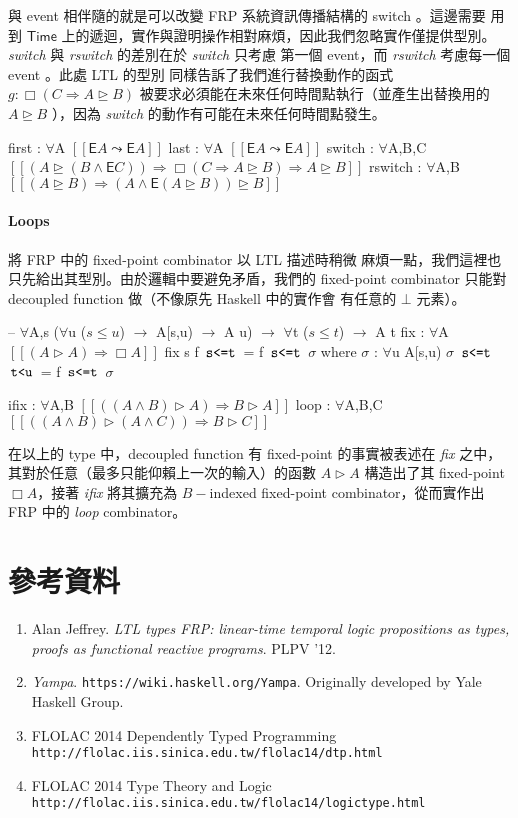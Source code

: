 \documentclass{article}
\newcommand{\llens}{[\![}
\newcommand{\rlens}{]\!]}
\newcommand{\Time}{\mathsf{Time}}
\newcommand{\TE}{\mathsf{E}}
\newcommand{\Wit}[1]{\,\text{\texttt{#1}}\,}
\newcommand{\Gs}{\sigma}
\begin{document}
  與 event 相伴隨的就是可以改變 FRP 系統資訊傳播結構的 switch 。這邊需要
  用到 $\Time$ 上的遞迴，實作與證明操作相對麻煩，因此我們忽略實作僅提供型別。
  \textit{switch} 與 \textit{rswitch} 的差別在於 \textit{switch} 只考慮
  第一個 event，而 \textit{rswitch} 考慮每一個 event 。此處 LTL 的型別
  同樣告訴了我們進行替換動作的函式 $g : \Box (C \Rightarrow A \unrhd B)$
  被要求必須能在未來任何時間點執行（並產生出替換用的 $A\unrhd B$ ），因為
  \textit{switch} 的動作有可能在未來任何時間點發生。

  \begin{code}
  first : $\forall${A} $\llens \TE A\leadsto \TE A\rlens$
  last : $\forall${A} $\llens \TE A\leadsto \TE A\rlens$
  switch : $\forall${A,B,C} $\llens (A\unrhd (B\land \TE C))\Rightarrow \Box(C\Rightarrow A\unrhd B) \Rightarrow A\unrhd B\rlens$
  rswitch : $\forall${A,B} $\llens (A\unrhd B) \Rightarrow (A\land \TE(A\unrhd B))\unrhd B\rlens$
  \end{code}
  \paragraph{Loops} 將 FRP 中的 fixed-point combinator 以 LTL 描述時稍微
  麻煩一點，我們這裡也只先給出其型別。由於邏輯中要避免矛盾，我們的 fixed-point
  combinator 只能對 decoupled function 做（不像原先 Haskell 中的實作會
  有任意的 $\bot$ 元素）。

  \begin{code}
  -- $\forall${A,s} ($\forall${u} ($s\le u$) $\to$ A[s,u) $\to$ A u) $\to$ $\forall${t} ($s\le t$) $\to$ A t
  fix : $\forall${A} $\llens (A\rhd A) \Rightarrow \Box A\rlens$
  fix {s} f $\Wit{s<=t}$ = f $\Wit{s<=t}$ $\Gs$ where
      $\Gs$ : $\forall${u} A[s,u)
      $\Gs$ $\Wit{s<=t}$ $\Wit{t<u}$ = f $\Wit{s<=t}$ $\Gs$

  ifix : $\forall${A,B} $\llens ((A\land B)\rhd A) \Rightarrow B\rhd A\rlens$
  loop : $\forall${A,B,C} $\llens ((A\land B)\rhd (A\land C)) \Rightarrow B\rhd C\rlens$
  \end{code}

  在以上的 type 中，decoupled function 有 fixed-point 的事實被表述在
  \textit{fix} 之中，其對於任意（最多只能仰賴上一次的輸入）的函數
  $A\rhd A$ 構造出了其 fixed-point $\Box A$，接著 \textit{ifix} 將其擴充為
  $B-$indexed fixed-point combinator，從而實作出 FRP 中的 \textit{loop}
  combinator。

\section{參考資料}
\begin{enumerate}
  \item Alan Jeffrey. \textit{LTL types FRP: linear-time temporal logic propositions as types, proofs as functional reactive programs}. PLPV '12.
  \item \textit{Yampa}. \texttt{https://wiki.haskell.org/Yampa}.
  Originally developed by Yale Haskell Group.
  \item FLOLAC 2014 Dependently Typed Programming \texttt{http://flolac.iis.sinica.edu.tw/flolac14/dtp.html}
  \item FLOLAC 2014 Type Theory and Logic \texttt{http://flolac.iis.sinica.edu.tw/flolac14/logictype.html}
\end{enumerate}
\end{document}
